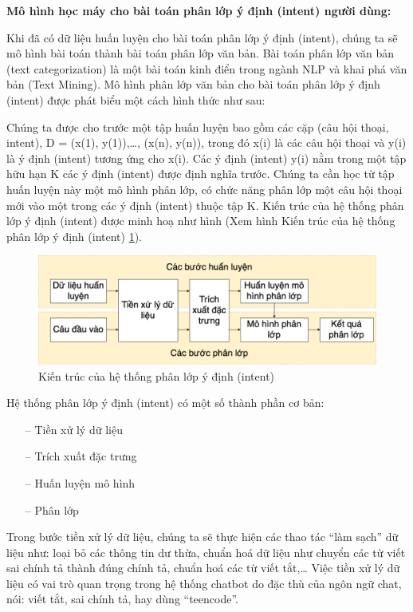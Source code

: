 \textbf{Mô hình học máy cho bài toán phân lớp ý định (intent) người dùng:}

Khi đã có dữ liệu huấn luyện cho bài toán phân lớp ý định (intent), chúng ta sẽ mô hình bài toán thành bài toán phân lớp văn bản. Bài toán phân lớp văn bản (text categorization) là một bài toán kinh điển trong ngành NLP và khai phá văn bản (Text Mining). Mô hình phân lớp văn bản cho bài toán phân lớp ý định (intent) được phát biểu một cách hình thức như sau:

Chúng ta được cho trước một tập huấn luyện bao gồm các cặp (câu hội thoại, intent), D = {(x(1), y(1)),…, (x(n), y(n))}, trong đó x(i) là các câu hội thoại và y(i) là ý định (intent) tương ứng cho x(i). Các ý định (intent) y(i) nằm trong một tập hữu hạn K các ý định (intent) được định nghĩa trước. Chúng ta cần học từ tập huấn luyện này một mô hình phân lớp, có chức năng phân lớp một câu hội thoại mới vào một trong các ý định (intent) thuộc tập K. Kiến trúc của hệ thống phân lớp ý định (intent) được minh hoạ như hình (Xem hình Kiến trúc của hệ thống phân lớp ý định (intent) \ref{fig:system-class-intent}).
\begin{figure}[htp]
    \centering
    \includegraphics[width=15cm]{images/structure-system-class-intent.png}
    \caption{Kiến trúc của hệ thống phân lớp ý định (intent)}
    \label{fig:system-class-intent}
\end{figure}

Hệ thống phân lớp ý định (intent) có một số thành phần cơ bản:
\begin{itemize}
    \item[--] Tiền xử lý dữ liệu
    \item[--] Trích xuất đặc trưng
    \item[--] Huấn luyện mô hình
    \item[--] Phân lớp
\end{itemize}
Trong bước tiền xử lý dữ liệu, chúng ta sẽ thực hiện các thao tác “làm sạch” dữ liệu như: loại bỏ các thông tin dư thừa, chuẩn hoá dữ liệu như chuyển các từ viết sai chính tả thành đúng chính tả, chuẩn hoá các từ viết tắt,… Việc tiền xử lý dữ liệu có vai trò quan trọng trong hệ thống chatbot do đặc thù của ngôn ngữ chat, nói: viết tắt, sai chính tả, hay dùng “teencode”.

